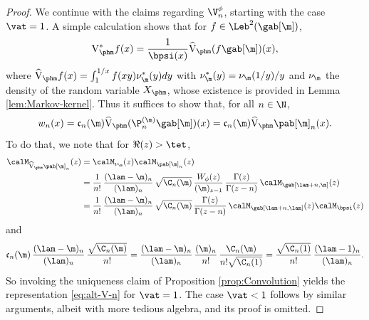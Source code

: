 \begin{proof}
We continue with the claims regarding $\V_n^\phi$, starting with the case $\vat=1$. A simple calculation
shows that for $f \in \Leb^2(\gab[\m])$,
\begin{equation*}
\mathrm{V}_{\phm}^* f(x) = \frac{1}{\bpsi(x)} \widehat{\mathrm{V}}_{\phm} (f \gab[\m])(x),
\end{equation*}
where $\widehat{\mathrm{V}}_{\phm} f(x) = \int_{1}^{1/x}f(xy)\nu_\m^*(y)dy$ with $\nu_\m^*(y) = \nu_\m(1/y)/y$ and $\nu_\m$ the density of the random variable $X_{\phm}$, whose existence is provided in Lemma \ref{lem:Markov-kernel}. Thus it suffices to show that, for all $n \in \N$,
\begin{equation*}
w_n(x) = \mathfrak{c}_n(\m)\widehat{\mathrm{V}}_{\phm} (\P_n^{(\m)} \gab[\m])(x) = \mathfrak{c}_n(\m) \widehat{\mathrm{V}}_{\phm} \pab[\m]_n(x).
\end{equation*}
To do that, we note that for $\Re(z) > \tet$,
\begin{align*}
\calM_{ \widehat{\mathrm{V}}_{\phm} \pab[\m]_n}(z)
&= \calM_{\nu_\m}(z) \calM_{\pab[\m]_n}(z) \\
&= \frac{1}{n!}\, \frac{(\lam-\m)_n}{(\lam)_n}\,\sqrt{\C_n(\m)}\, \frac{W_\phi(z)}{(\m)_{z-1}}\,\frac{\Gamma(z)}{\Gamma(z-n)}\, \calM_{\gab[\lam+n,\m]}(z) \\
&=\frac{1}{n!}\, \frac{(\lam-\m)_n}{(\lam)_n}\,\sqrt{\C_n(\m)}\, \frac{\Gamma(z)}{\Gamma(z-n)}\, \calM_{\gab[\lam+n,\lam]}(z) \calM_{\bpsi}(z)
\end{align*}
and
\begin{align*}
\mathfrak{c}_n(\m)\, \frac{(\lam-\m)_n}{(\lam)_n}\, \frac{\sqrt{\C_n(\m)}}{n!} = \frac{(\lam-\m)_n}{(\lam)_n}\, \frac{(\m)_n}{n!}\, \frac{\C_n(\m)}{n!\sqrt{\C_n(1)}} = \frac{\sqrt{\C_n(1)}}{n!}\, \frac{(\lam-1)_n}{(\lam)_n}.
\end{align*}
So invoking the uniqueness claim of Proposition \ref{prop:Convolution} yields the representation \eqref{eq:alt-V-n} for $\vat = 1$. The case $\vat < 1$ follows by similar arguments, albeit with more tedious algebra, and its proof is omitted.


\end{proof}
